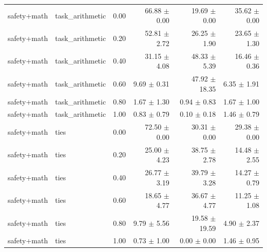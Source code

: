 \documentclass{article}
\begin{document}
\begin{table}[H]
{\begin{tabular}{lllrrr}
safety+math & task\_arithmetic & 0.00 & 66.88 $\pm$ 0.00 & 19.69 $\pm$ 0.00 & 35.62 $\pm$ 0.00 \\
safety+math & task\_arithmetic & 0.20 & 52.81 $\pm$ 2.72 & 26.25 $\pm$ 1.90 & 23.65 $\pm$ 1.30 \\
safety+math & task\_arithmetic & 0.40 & 31.15 $\pm$ 4.08 & 48.33 $\pm$ 5.39 & 16.46 $\pm$ 0.36 \\
safety+math & task\_arithmetic & 0.60 & 9.69 $\pm$ 0.31 & 47.92 $\pm$ 18.35 & 6.35 $\pm$ 1.91 \\
safety+math & task\_arithmetic & 0.80 & 1.67 $\pm$ 1.30 & 0.94 $\pm$ 0.83 & 1.67 $\pm$ 1.00 \\
safety+math & task\_arithmetic & 1.00 & 0.83 $\pm$ 0.79 & 0.10 $\pm$ 0.18 & 1.46 $\pm$ 0.79 \\
safety+math & ties & 0.00 & 72.50 $\pm$ 0.00 & 30.31 $\pm$ 0.00 & 29.38 $\pm$ 0.00 \\
safety+math & ties & 0.20 & 25.00 $\pm$ 4.23 & 38.75 $\pm$ 2.78 & 14.48 $\pm$ 2.55 \\
safety+math & ties & 0.40 & 26.77 $\pm$ 3.19 & 39.79 $\pm$ 3.28 & 14.27 $\pm$ 0.79 \\
safety+math & ties & 0.60 & 18.65 $\pm$ 4.77 & 36.67 $\pm$ 4.77 & 11.25 $\pm$ 1.08 \\
safety+math & ties & 0.80 & 9.79 $\pm$ 5.56 & 19.58 $\pm$ 19.59 & 4.90 $\pm$ 2.37 \\
safety+math & ties & 1.00 & 0.73 $\pm$ 1.00 & 0.00 $\pm$ 0.00 & 1.46 $\pm$ 0.95 \\
\bottomrule
\end{tabular}
}
\end{table}
\end{document}
